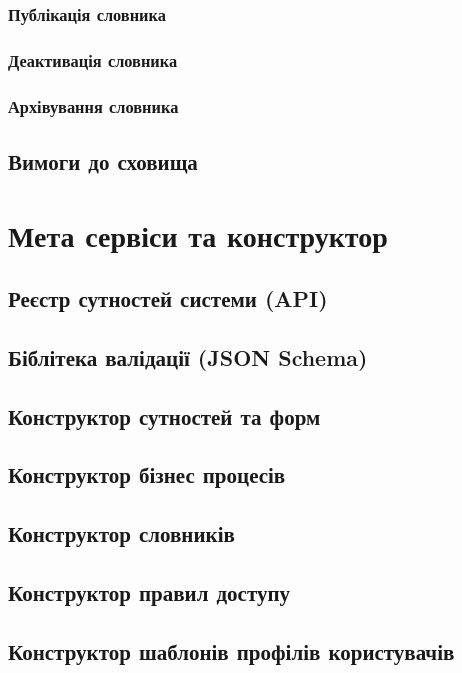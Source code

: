 \subsubsection{Публікація словника}

\subsubsection{Деактивація словника}

\subsubsection{Архівування словника}

\subsection{Вимоги до сховища}

\section*{Мета сервіси та конструктор}

\subsection*{Реєстр сутностей системи (API)}

\subsection*{Біблітека валідації (JSON Schema)}

\subsection*{Конструктор сутностей та форм}

\subsection*{Конструктор бізнес процесів}

\subsection*{Конструктор словників}

\subsection*{Конструктор правил доступу}

\subsection*{Конструктор шаблонів профілів користувачів}

